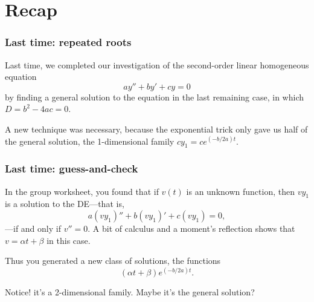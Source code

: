\def\encoding{UTF-8}

\def\mytitle{Reduction of Order}
\def\subtitle{A generalization of the repeated-roots technique}
\def\affiliation{The College of Idaho}
\def\mydate{22 March 2013}
\def\latexmode{beamer}
\def\fonttheme{structurebold}
\def\colortheme{crane}
\def\theme{Szeged}

\section{Recap}
\label{recap}

\begin{frame}

\frametitle{Last time: repeated roots}
\label{lasttime:repeatedroots}

Last time, we completed our investigation of the second-order linear homogeneous equation
\[ ay'' + by' + cy = 0 \]
by finding a general solution to the equation in the last remaining case, in which $ D = b^2 - 4ac = 0 $. 

A new technique was necessary, because the exponential trick only gave us half of the general solution, the 1-dimensional family $ cy_1 = ce^{(-b/2a)t} $.

\end{frame}

\begin{frame}

\frametitle{Last time: guess-and-check}
\label{lasttime:guess-and-check}

In the group worksheet, you found that if $ v(t) $ is an unknown function, then $ v y_1 $ is a solution to the DE---that is,
\[ a(v y_1)'' + b(v y_1)' + c(v y_1) = 0, \]
---if and only if $ v'' = 0 $. A bit of calculus and a moment's reflection shows that $ v = \alpha t + \beta $ in this case.

Thus you generated a new class of solutions, the functions
\[ (\alpha t + \beta) e^{(-b/2a)t}. \]

Notice! it's a 2-dimensional family. Maybe it's the general solution?

\end{frame}

